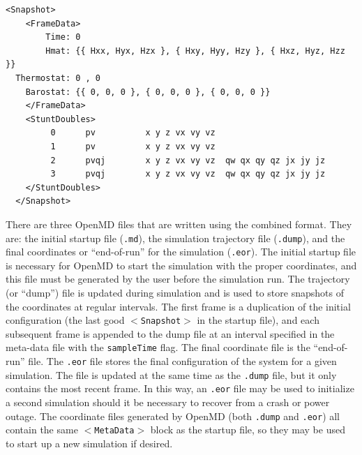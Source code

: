 \documentclass[]{book}
\begin{document}
\begin{lstlisting}[float,caption={[The format of the {\tt $<$Snapshot$>$} block]
An example of the format of the {\tt $<$Snapshot$>$} block.  There is an
initial sub-block called {\tt $<$FrameData$>$} which contains the time
stamp, the three column vectors of $\mathsf{H}$, and optional extra
information for the extended sytem ensembles.  The lines in the {\tt
$<$StuntDoubles$>$} sub-block provide information about the instantaneous
configuration of each integrable object.  For each integrable object,
the global index is followed by a short string describing what
additional information is present on the line.  Atoms with only
position and velocity information use the ``pv'' string which must
then be followed by the position and velocity vectors for that atom.
Directional atoms and Rigid Bodies typically use the ``pvqj'' string
which is followed by position, velocity, quaternions, and
lastly, body fixed angular momentum for that integrable object.},
label=sch:dumpFormat]
  <Snapshot>
    <FrameData>
        Time: 0
        Hmat: {{ Hxx, Hyx, Hzx }, { Hxy, Hyy, Hzy }, { Hxz, Hyz, Hzz }}
  Thermostat: 0 , 0
    Barostat: {{ 0, 0, 0 }, { 0, 0, 0 }, { 0, 0, 0 }}
    </FrameData>
    <StuntDoubles>
         0      pv          x y z vx vy vz
         1      pv          x y z vx vy vz
         2      pvqj        x y z vx vy vz  qw qx qy qz jx jy jz
         3      pvqj        x y z vx vy vz  qw qx qy qz jx jy jz
    </StuntDoubles>
  </Snapshot>
\end{lstlisting}

There are three {\sc OpenMD} files that are written using the combined
format.  They are: the initial startup file (\texttt{.md}), the
simulation trajectory file (\texttt{.dump}), and the final coordinates
or ``end-of-run'' for the simulation (\texttt{.eor}). The initial
startup file is necessary for {\sc OpenMD} to start the simulation with
the proper coordinates, and this file must be generated by the user
before the simulation run. The trajectory (or ``dump'') file is
updated during simulation and is used to store snapshots of the
coordinates at regular intervals. The first frame is a duplication of
the initial configuration (the last good {\tt $<$Snapshot$>$} in the
startup file), and each subsequent frame is appended to the dump file
at an interval specified in the meta-data file with the
\texttt{sampleTime} flag. The final coordinate file is the
``end-of-run'' file.  The \texttt{.eor} file stores the final
configuration of the system for a given simulation. The file is
updated at the same time as the \texttt{.dump} file, but it only
contains the most recent frame. In this way, an \texttt{.eor} file may
be used to initialize a second simulation should it be necessary to
recover from a crash or power outage. The coordinate files generated
by {\sc OpenMD} (both \texttt{.dump} and \texttt{.eor}) all contain the
same {\tt $<$MetaData$>$} block as the startup file, so they may be
used to start up a new simulation if desired.
\end{document}
